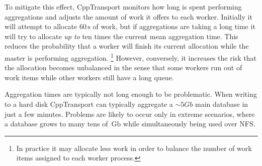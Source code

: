 \documentclass[11pt,a4paper]{article}
\newcommand{\packagefont}{\sffamily}
\newcommand{\CppTransport}{{\packagefont CppTransport}}
\newcommand{\SQLite}{{\packagefont SQLite}}
\newcommand{\Gb}{\,\mathrm{Gb}}
\newcommand{\second}{\,\mathrm{s}}
\newcommand{\semibold}[1]{{\fontseries{b}\selectfont{#1}}}
\begin{document}
\begin{itemize}
    To mitigate this effect, {\CppTransport} monitors how long is spent
    performing aggregations and adjusts the amount of work it offers
    to each worker.
    Initially it will attempt to allocate $60\second$ of work,
    but if aggregations are taking a long time
    it will try to allocate \emph{up to}
    ten times the current mean aggregation time.
    This reduces the probability that a worker will finish its current
    allocation while the master is performing aggregation.%
        \footnote{In practice it may allocate less work in order to balance the
        number of work items assigned to each worker process.}
    However, conversely, it increases the risk that the allocation becomes unbalanced
    in the sense that some workers run out of work items while other workers
    still have a long queue.

    \semibold{Alternative strategies.}
    Aggregation times are typically not long enough to be problematic.
    When writing to a hard disk {\CppTransport} can typically aggregate a $\sim 5 Gb$
    main database in just a few minutes.
    Problems are likely to occur only in extreme scenarios, where a database grows to
    many tens of $\Gb$ while simultaneously being used over NFS.

    
    
    

\end{itemize}
\end{document}
